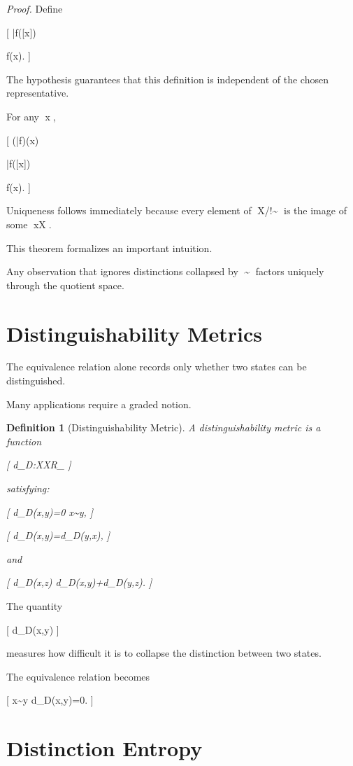 \documentclass[11pt,oneside,openany]{book}
\newtheorem{definition}{Definition}[chapter] \newtheorem{theorem}{Theorem}[chapter] \newtheorem{proposition}{Proposition}[chapter] \newtheorem{lemma}{Lemma}[chapter] \newtheorem{corollary}{Corollary}[chapter] \newtheorem{remark}{Remark}[chapter]
\begin{document}
\begin{proof}

Define

[
\bar f([x])

f(x).
]

The hypothesis guarantees that this definition is independent of the chosen representative.

For any x,

[
(\bar f\circ\pi)(x)

\bar f([x])

f(x).
]

Uniqueness follows immediately because every element of X/!\sim is the image of some x\in X.

\end{proof}

This theorem formalizes an important intuition.

Any observation that ignores distinctions collapsed by \sim factors uniquely through the quotient space.

\section{Distinguishability Metrics}

The equivalence relation alone records only whether two states can be distinguished.

Many applications require a graded notion.

\begin{definition}[Distinguishability Metric]

A distinguishability metric is a function

[
d_D:X\times X\rightarrow \mathbb R_{}
]

satisfying:

[
d_D(x,y)=0
\iff
x\sim y,
]

[
d_D(x,y)=d_D(y,x),
]

and

[
d_D(x,z)
\le
d_D(x,y)+d_D(y,z).
]

\end{definition}

The quantity

[
d_D(x,y)
]

measures how difficult it is to collapse the distinction between two states.

The equivalence relation becomes

[
x\sim y
\iff
d_D(x,y)=0.
]

\section{Distinction Entropy}
\end{document}
